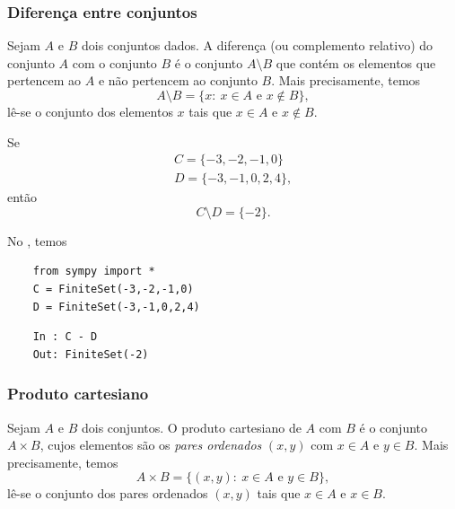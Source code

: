 \subsubsection{Diferença entre conjuntos}

Sejam $A$ e $B$ dois conjuntos dados. A diferença (ou complemento relativo) do conjunto $A$ com o conjunto $B$ é o conjunto $A\setminus B$ que contém os elementos que pertencem ao $A$ e não pertencem ao conjunto $B$. Mais precisamente, temos
\begin{equation}
  A\setminus B = \{x:~x\in A \text{ e } x\not\in B\},
\end{equation}
lê-se o conjunto dos elementos $x$ tais que $x\in A$ e $x\not\in B$.

\begin{ex}
  Se
  \begin{gather}
    C = \{-3, -2, -1, 0\}\\
    D = \{-3, -1, 0, 2, 4\},
  \end{gather}
  então
  \begin{equation}
    C\setminus D = \{-2\}.
  \end{equation}

  \ifispython
  No \python, temos
  \begin{lstlisting}
    from sympy import *
    C = FiniteSet(-3,-2,-1,0)
    D = FiniteSet(-3,-1,0,2,4)
  \end{lstlisting}
  \begin{lstlisting}
    In : C - D
    Out: FiniteSet(-2)
  \end{lstlisting}
  \fi
\end{ex}

\subsubsection{Produto cartesiano}

Sejam $A$ e $B$ dois conjuntos. O produto cartesiano de $A$ com $B$ é o conjunto $A\times B$, cujos elementos são os \emph{pares ordenados} $(x, y)$ com $x\in A$ e $y\in B$. Mais precisamente, temos
\begin{equation}
  A\times B = \{(x, y):~x\in A \text{ e } y\in B\},
\end{equation}
lê-se o conjunto dos pares ordenados $(x, y)$ tais que $x\in A$ e $x\in B$.

